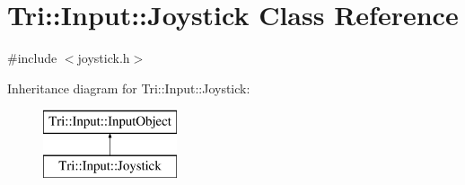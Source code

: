 \hypertarget{class_tri_1_1_input_1_1_joystick}{}\section{Tri\+:\+:Input\+:\+:Joystick Class Reference}
\label{class_tri_1_1_input_1_1_joystick}


{\ttfamily \#include $<$joystick.\+h$>$}

Inheritance diagram for Tri\+:\+:Input\+:\+:Joystick\+:\begin{figure}[H]
\begin{center}
\leavevmode
\includegraphics[height=2.000000cm]{class_tri_1_1_input_1_1_joystick}
\end{center}
\end{figure}
